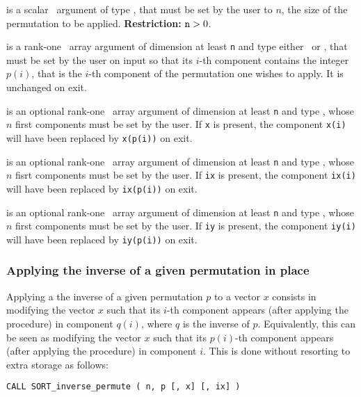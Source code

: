 \documentclass{galahad}
\newcommand{\packagename}{SORT}
\begin{document}
\begin{description}
 is a scalar \intentin\ argument of type
\integer, that must be set by the user to $n$, the size of the permutation to
be applied.
{\bf Restriction:} ${\tt n} > 0$.

 is a rank-one \intentinout\ array argument of
dimension at least {\tt n} and type either
\integer\ or \realdp, that must be set by the user
on input so that its $i$-th component contains the integer $p(i)$, that is the
$i$-th component of the permutation one wishes to apply.
It is unchanged on exit.

 is an optional rank-one \intentinout\ array argument of
dimension at least {\tt n} and type \realdp, whose $n$ first components must
be set by the user. If {\tt x} is present, the component {\tt x(i)} will have
been replaced by {\tt x(p(i))} on exit.

 is an optional rank-one \intentinout\ array argument of
dimension at least {\tt n} and type \integer, whose $n$ fisrt components must
be set by the user. If {\tt ix} is present, the component {\tt ix(i)} will have
been replaced by {\tt ix(p(i))} on exit.

 is an optional rank-one \intentinout\ array argument of
dimension at least {\tt n} and type \integer, whose $n$ first components must
be set by the user. If {\tt iy} is present, the component {\tt iy(i)} will have
been replaced by {\tt iy(p(i))} on exit.
\end{description}

\subsubsection{Applying the inverse of a given permutation in place}

Applying a the inverse of a given permutation $p$ to a vector $x$ consists in
modifying the vector $x$ such that its $i$-th component appears (after
applying the procedure) in component $q(i)$, where $q$ is the inverse of
$p$. Equivalently, this can be seen as modifying the vector $x$ such that its
$p(i)$-th component appears (after applying the procedure) in component $i$.
This is done without resorting to extra storage as follows:
\vspace*{1mm}

{\tt CALL \packagename\_inverse\_permute ( n, p [, x] [, ix] )}
\end{document}
